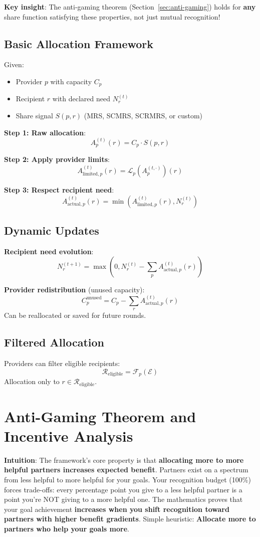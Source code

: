 \documentclass[11pt,a4paper]{article}
\theoremstyle{definition}
\theoremstyle{remark}
\newcommand{\E}{\mathcal{E}}
\newcommand{\F}{\mathcal{F}}
\begin{document}
\textbf{Key insight}: The anti-gaming theorem (Section~\ref{sec:anti-gaming}) holds for \textbf{any} share function satisfying these properties, not just mutual recognition!

\subsection{Basic Allocation Framework}

Given:
\begin{itemize}
\item Provider $p$ with capacity $C_p$
\item Recipient $r$ with declared need $N_r^{(t)}$
\item Share signal $S(p,r)$ (MRS, SCMRS, SCRMRS, or custom)
\end{itemize}

\textbf{Step 1: Raw allocation}:
\[ A_p^{(t)}(r) = C_p \cdot S(p,r) \]

\textbf{Step 2: Apply provider limits}:
\[ A_{\text{limited},p}^{(t)}(r) = \mathcal{L}_p(A_p^{(t,\cdot)})(r) \]

\textbf{Step 3: Respect recipient need}:
\[ A_{\text{actual},p}^{(t)}(r) = \min(A_{\text{limited},p}^{(t)}(r), N_r^{(t)}) \]

\subsection{Dynamic Updates}

\textbf{Recipient need evolution}:
\[ N_r^{(t+1)} = \max\left(0, N_r^{(t)} - \sum_{p} A_{\text{actual},p}^{(t)}(r)\right) \]

\textbf{Provider redistribution} (unused capacity):
\[ C_p^{\text{unused}} = C_p - \sum_{r} A_{\text{actual},p}^{(t)}(r) \]
Can be reallocated or saved for future rounds.

\subsection{Filtered Allocation}

Providers can filter eligible recipients:
\[ \mathcal{R}_{\text{eligible}} = \F_p(\E) \]
Allocation only to $r \in \mathcal{R}_{\text{eligible}}$.

\section{Anti-Gaming Theorem and Incentive Analysis}

\textbf{Intuition}: The framework's core property is that \textbf{allocating more to more helpful partners increases expected benefit}. Partners exist on a spectrum from less helpful to more helpful for your goals. Your recognition budget (100\%) forces trade-offs: every percentage point you give to a less helpful partner is a point you're NOT giving to a more helpful one. The mathematics proves that your goal achievement \textbf{increases when you shift recognition toward partners with higher benefit gradients}. Simple heuristic: \textbf{Allocate more to partners who help your goals more}.
\end{document}
